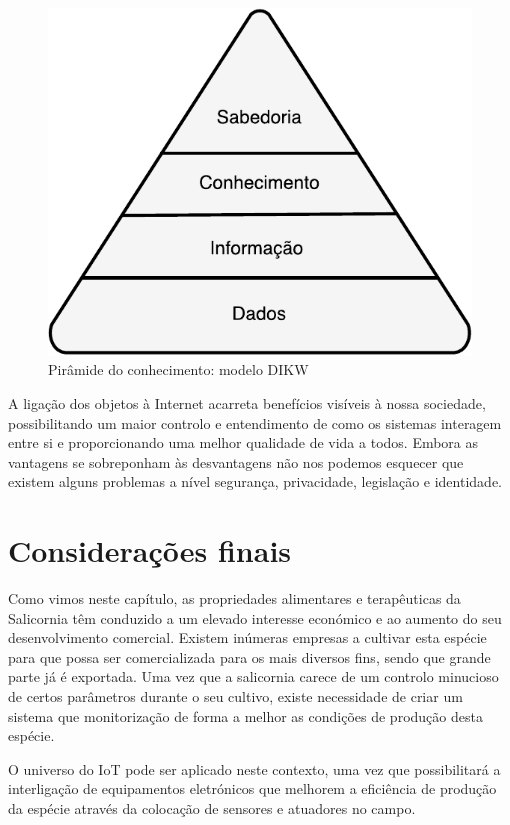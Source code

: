 \begin{figure}[!htb]
	\centering
	\includegraphics[scale=0.8]{img/cap3-iot/dikw.pdf}
	\caption{Pirâmide do conhecimento: modelo DIKW}
	\label{dikw1}
\end{figure}



A ligação dos objetos à Internet acarreta benefícios visíveis à nossa sociedade, possibilitando um maior controlo e entendimento de como os sistemas interagem entre si e proporcionando uma melhor qualidade de vida a todos. Embora as vantagens se sobreponham às desvantagens não nos podemos esquecer que existem alguns problemas a nível segurança, privacidade, legislação e identidade.



\section{Considerações finais}


Como vimos neste capítulo, as propriedades alimentares e terapêuticas da Salicornia têm conduzido a um elevado interesse económico e ao aumento do seu desenvolvimento comercial. Existem inúmeras empresas a cultivar esta espécie para que possa ser comercializada para os mais diversos fins, sendo que grande parte já é exportada. Uma vez que a salicornia carece de um controlo minucioso de certos parâmetros durante o seu cultivo, existe necessidade de criar um sistema que monitorização de forma a melhor as condições de produção desta espécie. 

O universo do \ac{IoT} pode ser aplicado neste contexto, uma vez que possibilitará a interligação de equipamentos eletrónicos que melhorem a eficiência de produção da espécie através da colocação de sensores e atuadores no campo.  





